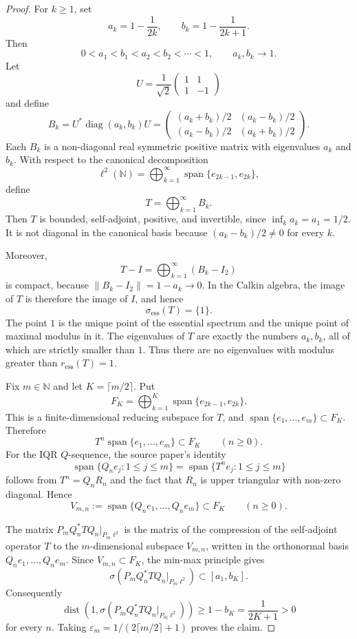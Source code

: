\documentclass[11pt]{article}
\newcommand{\N}{\mathbb N}
\newcommand{\ess}{\mathrm{ess}}
\newcommand{\diag}{\operatorname{diag}}
\newcommand{\spn}{\operatorname{span}}
\newcommand{\dist}{\operatorname{dist}}
\begin{document}
\begin{proof}
For \(k\geq1\), set
\[
  a_k=1-\frac1{2k},\qquad b_k=1-\frac1{2k+1}.
\]
Then
\[
  0<a_1<b_1<a_2<b_2<\cdots<1,\qquad a_k,b_k\to1.
\]
Let
\[
  U=\frac1{\sqrt2}
  \begin{pmatrix}
  1&1\\
  1&-1
  \end{pmatrix}
\]
and define
\[
  B_k=U^*\diag(a_k,b_k)U
  =
  \begin{pmatrix}
  (a_k+b_k)/2&(a_k-b_k)/2\\
  (a_k-b_k)/2&(a_k+b_k)/2
  \end{pmatrix}.
\]
Each \(B_k\) is a non-diagonal real symmetric positive matrix with eigenvalues
\(a_k\) and \(b_k\).  With respect to the canonical decomposition
\[
  \ell^2(\N)=\bigoplus_{k=1}^{\infty}
  \spn\{e_{2k-1},e_{2k}\},
\]
define
\[
  T=\bigoplus_{k=1}^{\infty} B_k.
\]
Then \(T\) is bounded, self-adjoint, positive, and invertible, since
\(\inf_k a_k=a_1=1/2\).  It is not diagonal in the canonical basis because
\((a_k-b_k)/2\neq0\) for every \(k\).

Moreover,
\[
  T-I=\bigoplus_{k=1}^{\infty}(B_k-I_2)
\]
is compact, because \(\|B_k-I_2\|=1-a_k\to0\).  In the Calkin algebra, the image
of \(T\) is therefore the image of \(I\), and hence
\[
  \sigma_{\ess}(T)=\{1\}.
\]
The point \(1\) is the unique point of the essential spectrum and the unique
point of maximal modulus in it.  The eigenvalues of \(T\) are exactly the
numbers \(a_k,b_k\), all of which are strictly smaller than \(1\).  Thus there
are no eigenvalues with modulus greater than \(r_{\ess}(T)=1\).

Fix \(m\in\N\) and let \(K=\lceil m/2\rceil\).  Put
\[
  F_K=\bigoplus_{k=1}^{K}\spn\{e_{2k-1},e_{2k}\}.
\]
This is a finite-dimensional reducing subspace for \(T\), and
\(\spn\{e_1,\ldots,e_m\}\subset F_K\).  Therefore
\[
  T^n\spn\{e_1,\ldots,e_m\}\subset F_K
  \qquad(n\geq0).
\]
For the IQR \(Q\)-sequence, the source paper's identity
\[
  \spn\{Q_n e_j:1\leq j\leq m\}
  =
  \spn\{T^n e_j:1\leq j\leq m\}
\]
follows from \(T^n=Q_nR_n\) and the fact that \(R_n\) is upper triangular with
non-zero diagonal.  Hence
\[
  V_{m,n}:=\spn\{Q_ne_1,\ldots,Q_ne_m\}\subset F_K
  \qquad(n\geq0).
\]

The matrix \(P_mQ_n^*TQ_n\vert_{P_m\ell^2}\) is the matrix of the compression of
the self-adjoint operator \(T\) to the \(m\)-dimensional subspace \(V_{m,n}\),
written in the orthonormal basis \(Q_ne_1,\ldots,Q_ne_m\).  Since
\(V_{m,n}\subset F_K\), the min-max principle gives
\[
  \sigma(P_mQ_n^*TQ_n\vert_{P_m\ell^2})
  \subset [a_1,b_K].
\]
Consequently
\[
  \dist\!\left(1,\sigma(P_mQ_n^*TQ_n\vert_{P_m\ell^2})\right)
  \geq 1-b_K
  = \frac1{2K+1}
  >0
\]
for every \(n\).  Taking \(\varepsilon_m=1/(2\lceil m/2\rceil+1)\) proves the
claim.
\end{proof}
\end{document}
